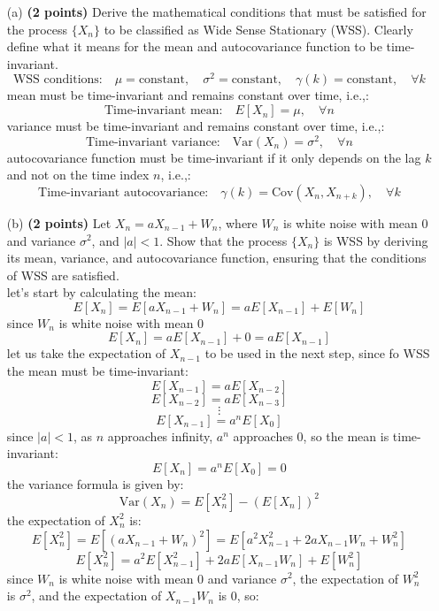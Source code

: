 \documentclass{article}
\begin{document}
\begin{itemize}
    \item[(a)] \textbf{(2 points)} Derive the mathematical conditions that must be satisfied for the process \( \{X_n\} \) to be classified as Wide Sense Stationary (WSS). Clearly define what it means for the mean and autocovariance function to be time-invariant.
    \[
    \text{WSS conditions:} \quad \mu = \text{constant},\quad  \sigma^2 = \text{constant} ,\quad \gamma(k) = \text{constant}, \quad \forall k
    \]
    mean must be time-invariant and  remains constant over time, i.e.,:
    \[
    \text{Time-invariant mean:} \quad E[X_n] = \mu, \quad \forall n
    \]
    variance must be time-invariant and remains constant over time, i.e.,:
    \[
    \text{Time-invariant variance:} \quad \text{Var}(X_n) = \sigma^2, \quad \forall n
    \]
    autocovariance function must be time-invariant if it only depends on the lag \( k \) and not on the time index \( n \), i.e.,:
    \[
    \text{Time-invariant autocovariance:} \quad \gamma(k) = \text{Cov}(X_n, X_{n+k}), \quad \forall k
    \]
    \item[(b)] \textbf{(2 points)} Let \( X_n = a X_{n-1} + W_n \), where \( W_n \) is white noise with mean 0 and variance \( \sigma^2 \), and \( |a| < 1 \). Show that the process \( \{X_n\} \) is WSS by deriving its mean, variance, and autocovariance function, ensuring that the conditions of WSS are satisfied.
    \\ let's start by calculating the mean:
    \[
    E[X_n] = E[aX_{n-1} + W_n] = aE[X_{n-1}] + E[W_n] 
    \]
    since \( W_n \) is white noise with mean 0
    \[
    E[X_n] = aE[X_{n-1}] + 0 = aE[X_{n-1}]
    \]
    let us take the expectation of \( X_{n-1} \) to be used in the next step, since fo WSS the mean must be time-invariant:
    \[
    E[X_{n-1}] = aE[X_{n-2}]
    \]
    \[
    E[X_{n-2}] = aE[X_{n-3}]
    \]
    \[
    \vdots
    \]
    \[
    E[X_{n-1}] = a^n E[X_{0}]
    \]
    since $|a| < 1$, as \( n \) approaches infinity, \( a^n \) approaches 0, so the mean is time-invariant:
    \[
    E[X_n] = a^n E[X_{0}] = 0
    \]
    the variance formula is given by:
    \[
    \text{Var}(X_n) = E[X_n^2] - (E[X_n])^2
    \]
    the expectation of \( X_n^2 \) is:
    \[
    E[X_n^2] = E[(aX_{n-1} + W_n)^2] = E[a^2X_{n-1}^2 + 2aX_{n-1}W_n + W_n^2]
    \]
    \[
    E[X_n^2] = a^2E[X_{n-1}^2] + 2aE[X_{n-1}W_n] + E[W_n^2]
    \]
    since \( W_n \) is white noise with mean 0 and variance \( \sigma^2 \), the expectation of \( W_n^2 \) is \( \sigma^2 \), and the expectation of \( X_{n-1}W_n \) is 0, so:

\end{itemize}
\end{document}
